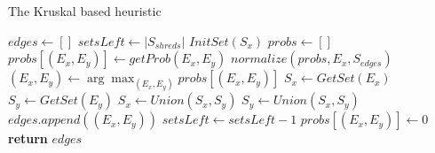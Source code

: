 \begin{algorithm}[h]
\caption{The Kruskal based heuristic}
\begin{algorithmic}[1]
  \State $edges \gets []$ 
  \State $setsLeft \gets |S_{shreds}|$ 
    \State $InitSet(S_x)$
  \EndFor
  \Statex
    \State $probs \gets []$ 
        \State $probs[(E_x,E_y)] \gets getProb(E_x,E_y)$  
      \EndFor
      \State $normalize(probs, E_x, S_{edges})$ 
    \EndFor
    \State $(E_x,E_y) \gets \arg\max_{(E_x,E_y)} probs[(E_x,E_y)]$
    \State $S_x \gets GetSet(E_x)$ 
    \State $S_y \gets GetSet(E_y)$
      \State $S_x \gets Union(S_x,S_y)$ 
      \State $S_y \gets Union(S_x,S_y)$
      \State $edges.append((E_x,E_y))$
      \State $setsLeft \gets setsLeft - 1$  
    \EndIf
    \State $probs[(E_x,E_y)] \gets 0$ 
  \EndWhile
  \Statex
  \State \textbf{return} $edges$ 
\EndProcedure
\end{algorithmic}
\label{alg:kruskal}
\end{algorithm}

